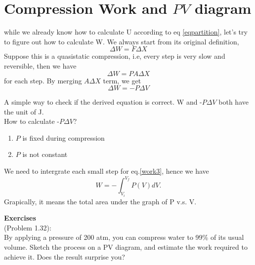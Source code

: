 \documentclass[twoside]{article}
\begin{document}
\section{Compression Work and $PV$ diagram}
while we already know how to calculate U according to eq \ref{eqpartition}, let's try to figure out how to calculate W.
We always start from its original definition,
\begin{equation} \label{work1} \Delta W = F \Delta{X} \end{equation}
Suppose this is a quasistatic compression, i.e, every step is very slow and reversible, then we have
\begin{equation} \label{work2} \Delta W = P A \Delta{X} \end{equation}
for each step. By merging $A\Delta{X}$ term, we get
\begin{equation} \label{work3} \Delta W = - P \Delta{V} \end{equation}

A simple way to check if the derived equation is correct. W and -$P\Delta{V}$ both have the unit of J.\\
How to calculate -$P\Delta{V}$?
\begin{enumerate}
\item{$P$ is fixed during compression}
\item{$P$ is not constant}
\end{enumerate}
We need to intergrate each small step for eq.\ref{work3}, hence we have
\begin{equation} \label{work4} W = -\int_{V_{i}}^{V_{f}} P(V)dV. \end{equation}
Grapically, it means the total area under the graph of P v.s. V. \\

{}


{\bf Exercises}\\
(Problem 1.32):\\
By applying a pressure of 200 atm, you can compress water to 99\% of its usual volume. Sketch the process on a PV diagram, and estimate the work required to achieve it. Does the result surprise you? \\\\\\\\\\\\\\
\end{document}
